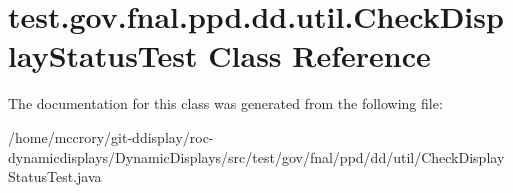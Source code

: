 \hypertarget{classtest_1_1gov_1_1fnal_1_1ppd_1_1dd_1_1util_1_1CheckDisplayStatusTest}{\section{test.\-gov.\-fnal.\-ppd.\-dd.\-util.\-Check\-Display\-Status\-Test Class Reference}
\label{classtest_1_1gov_1_1fnal_1_1ppd_1_1dd_1_1util_1_1CheckDisplayStatusTest}
}


The documentation for this class was generated from the following file\-:\begin{DoxyCompactItemize}
\item 
/home/mccrory/git-\/ddisplay/roc-\/dynamicdisplays/\-Dynamic\-Displays/src/test/gov/fnal/ppd/dd/util/Check\-Display\-Status\-Test.\-java\end{DoxyCompactItemize}
